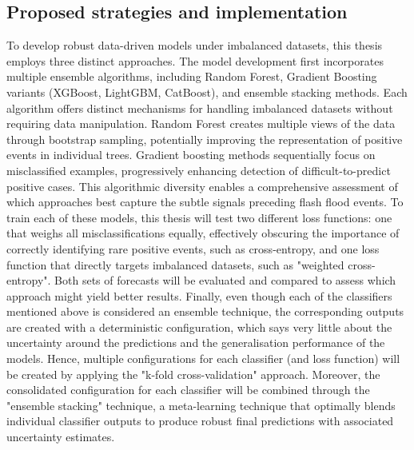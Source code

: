 \subsection{Proposed strategies and implementation}

To  develop robust data-driven models under imbalanced datasets, this thesis employs three distinct approaches. The model development first incorporates multiple ensemble algorithms, including Random Forest, Gradient Boosting variants (XGBoost, LightGBM, CatBoost), and ensemble stacking methods. Each algorithm offers distinct mechanisms for handling imbalanced datasets without requiring data manipulation. Random Forest creates multiple views of the data through bootstrap sampling, potentially improving the representation of positive events in individual trees. Gradient boosting methods sequentially focus on misclassified examples, progressively enhancing detection of difficult-to-predict positive cases. This algorithmic diversity enables a comprehensive assessment of which approaches best capture the subtle signals preceding flash flood events. To train each of these models, this thesis will test two different loss functions: one that weighs all misclassifications equally, effectively obscuring the importance of correctly identifying rare positive events, such as cross-entropy, and one loss function that directly targets imbalanced datasets, such as "weighted cross-entropy". Both sets of forecasts will be evaluated and compared to assess which approach might yield better results. Finally, even though each of the classifiers mentioned above is considered an ensemble technique, the corresponding outputs are created with a deterministic configuration, which says very little about the uncertainty around the predictions and the generalisation performance of the models. Hence, multiple configurations for each classifier (and loss function) will be created by applying the "k-fold cross-validation" approach. Moreover, the consolidated configuration for each classifier will be combined through the "ensemble stacking" technique, a meta-learning technique that optimally blends individual classifier outputs to produce robust final predictions with associated uncertainty estimates.

